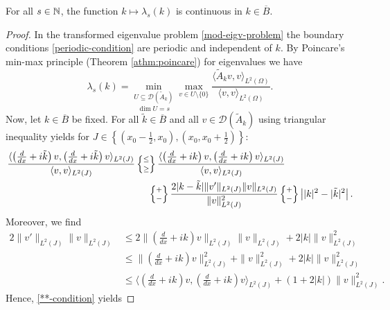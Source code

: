 \begin{theorem} \label{6.1}
	For all $s \in \mathbb{N}$, the function $k \mapsto \lambda_{s}(k)$ is continuous in $k \in \overline{B}$.
	\begin{proof}
		In the transformed eigenvalue problem \eqref{mod-eigv-problem} the boundary conditions \eqref{periodic-condition} are periodic and independent of $k$. By Poincare's min-max principle (Theorem \ref{athm:poincare}) for eigenvalues we have
		\begin{equation}
			\lambda_{s}(k) = \underset{\dim U = s}{\min_{U \subseteq \mathcal{D}(\tilde{A}_{k})}} \max_{v \in U \setminus \{ 0 \} } \frac{\langle \tilde{A}_{k} v, v \rangle_{L^{2}(\Omega)}}{\langle v, v \rangle_{L^{2}(\Omega)}}.  \label{poincare} 
		\end{equation} 
		Now, let $k \in \overline{B}$ be fixed. For all $\tilde{k} \in \overline{B}$ and all $v \in \mathcal{D}(\tilde{A}_{k})$ using triangular inequality yields for $J \in \left\{ (x_{0} - \frac{1}{2}, x_{0}), (x_{0}, x_{0} + \frac{1}{2}) \right\}$:
		\begin{align}
			 \frac{ \langle \left( \frac{d}{dx} + i\tilde{k} \right) v , \left( \frac{d}{dx} + i\tilde{k} \right) v \rangle_{L^{2}(J)}}{\langle v , v \rangle_{L^{2}(J)}} & \left\{\mathrel{\substack{\leq \\[0.1cm] \geq}}\right\} \frac{ \langle \left( \frac{d}{dx} + ik \right) v , \left( \frac{d}{dx} + ik \right) v \rangle_{L^{2}(J)}}{\langle v , v \rangle_{L^{2}(J)}} \notag \\
			& ~\quad \left\{\mathrel{\substack{+ \\[0.1cm] -}}\right\} \frac{2 |k-\tilde{k}|\|v'\|_{L^{2}(J)} \| v \|_{L^{2}(J)}}{\| v \|^{2}_{L^{2}(J)}} \left\{\mathrel{\substack{+ \\[0.1cm] -}}\right\} \left| |k|^{2} - |\tilde{k}|^{2} \right|. \label{**-condition}
		\end{align}
		Moreover, we find
		\begin{align*}
			2 \| v' \|_{L^{2}(J)} \| v \|_{L^{2}(J)} & \leq 2 \| \left( \frac{d}{dx} + ik \right) v\|_{L^{2}(J)} \| v \|_{L^{2}(J)} + 2|k| \|v\|^{2}_{L^{2}(J)} \\
			& \leq \| \left( \frac{d}{dx} + ik \right) v \|^{2}_{L^{2}(J)} + \| v \|^{2}_{L^{2}(J)} + 2 |k| \| v \|^{2}_{L^{2}(J)} \\
			& \leq \langle  \left( \frac{d}{dx} + ik \right) v,  \left( \frac{d}{dx} + ik \right) v \rangle_{L^{2}(J)} + (1 + 2|k|) \|v\|^{2}_{L^{2}(J)}.
		\end{align*}
		Hence, \eqref{**-condition} yields

\end{proof}
\end{theorem}
